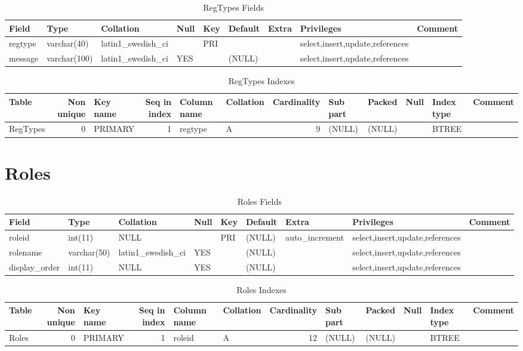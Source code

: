 \documentclass[captions=tablesignature]{scrartcl}
\begin{document}
\begin{table}[htb]
\caption{\label{tbl:regtypesfields}RegTypes Fields}
\centering
\begin{tabular}{lllllllll}
\hline
Field & Type & Collation & Null & Key & Default & Extra & Privileges & Comment\\
\hline
regtype & varchar(40) & latin1\_swedish\_ci &  & PRI &  &  & select,insert,update,references & \\
message & varchar(100) & latin1\_swedish\_ci & YES &  & (NULL) &  & select,insert,update,references & \\
\hline
\end{tabular}
\end{table}

\begin{table}[htb]
\caption{\label{tbl:regtypesindexes}RegTypes Indexes}
\centering
\begin{tabular}{lrlrllrlllll}
\hline
Table & Non unique & Key name & Seq in index & Column name & Collation & Cardinality & Sub part & Packed & Null & Index type & Comment\\
\hline
RegTypes & 0 & PRIMARY & 1 & regtype & A & 9 & (NULL) & (NULL) &  & BTREE & \\
\hline
\end{tabular}
\end{table}
\section{Roles}
\label{sec-20}

\begin{table}[htb]
\caption{\label{tbl:rolesfields}Roles Fields}
\centering
\begin{tabular}{lllllllll}
\hline
Field & Type & Collation & Null & Key & Default & Extra & Privileges & Comment\\
\hline
roleid & int(11) & NULL &  & PRI & (NULL) & auto\_increment & select,insert,update,references & \\
rolename & varchar(50) & latin1\_swedish\_ci & YES &  & (NULL) &  & select,insert,update,references & \\
display\_order & int(11) & NULL & YES &  & (NULL) &  & select,insert,update,references & \\
\hline
\end{tabular}
\end{table}

\begin{table}[htb]
\caption{\label{tbl:rolesindexes}Roles Indexes}
\centering
\begin{tabular}{lrlrllrlllll}
\hline
Table & Non unique & Key name & Seq in index & Column name & Collation & Cardinality & Sub part & Packed & Null & Index type & Comment\\
\hline
Roles & 0 & PRIMARY & 1 & roleid & A & 12 & (NULL) & (NULL) &  & BTREE & \\
\hline
\end{tabular}
\end{table}
\end{document}
